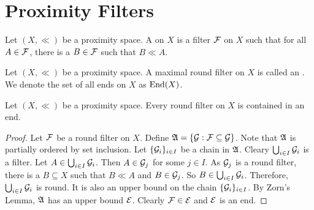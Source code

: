 \section{Proximity Filters}
\label{proxfilters}
	
\begin{definition}
	Let \( (X,\ll) \) be a proximity space.  A  on \( X \) is a filter \( \mathcal{F} \) on \( X \) such that for all \( A \in \mathcal{F} \), there is a \( B \in \mathcal{F} \) such that \( B \ll A \).
\end{definition}

\begin{definition}
	Let \( (X,\ll) \) be a proximity space.  A maximal round filter on \( X \) is called an .  We denote the set of all ends on \( X \) as \( \operatorname{End}(X) \).
\end{definition}

\begin{proposition}
	\label{roundinend}
	Let \( (X,\ll) \) be a proximity space.  Every round filter on \( X \) is contained in an end.
\end{proposition}
\begin{proof}
	Let \( \mathcal{F} \) be a round filter on \( X \).  Define \( \mathfrak{A} = \{ \mathcal{G}: \mathcal{F} \subseteq \mathcal{G} \} \).  Note that \( \mathfrak{A} \) is partially ordered by set inclusion.  Let \( \{ \mathcal{G}_i \}_{i \in I} \) be a chain in \( \mathfrak{A} \).  Cleary \( \bigcup_{i \in I} \mathcal{G}_i \) is a filter.  Let \( A \in \bigcup_{i \in I} \mathcal{G}_i \).  Then \( A \in \mathcal{G}_j \) for some \( j \in I \).  As \( \mathcal{G}_j \) is a round filter, there is a \( B \subseteq X \) such that \( B \ll A \) and \( B \in \mathcal{G}_j \).  So \( B \in \bigcup_{i \in I} \mathcal{G}_i \).  Therefore, \( \bigcup_{i \in I} \mathcal{G}_i \) is round.  It is also an upper bound on the chain \( \{ \mathcal{G}_i \}_{i \in I} \).  By Zorn's Lemma, \( \mathfrak{A} \) has an upper bound \( \mathcal{E} \).  Clearly \( \mathcal{F} \in \mathcal{E} \) and \( \mathcal{E} \) is an end.
\end{proof}

